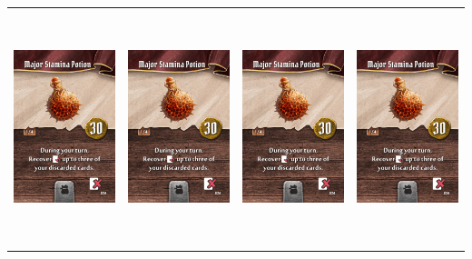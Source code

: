 \documentclass{minimal}
\begin{document}
{\begin{longtable}{llll}
\includegraphics[width=44mm,height=68mm]{./29-35/gh-034-major-stamina-potion.png} &
\includegraphics[width=44mm,height=68mm]{./29-35/gh-034-major-stamina-potion.png} &
\includegraphics[width=44mm,height=68mm]{./29-35/gh-034-major-stamina-potion.png} &
\includegraphics[width=44mm,height=68mm]{./29-35/gh-034-major-stamina-potion.png}\\ 

\end{longtable}}
\end{document}
